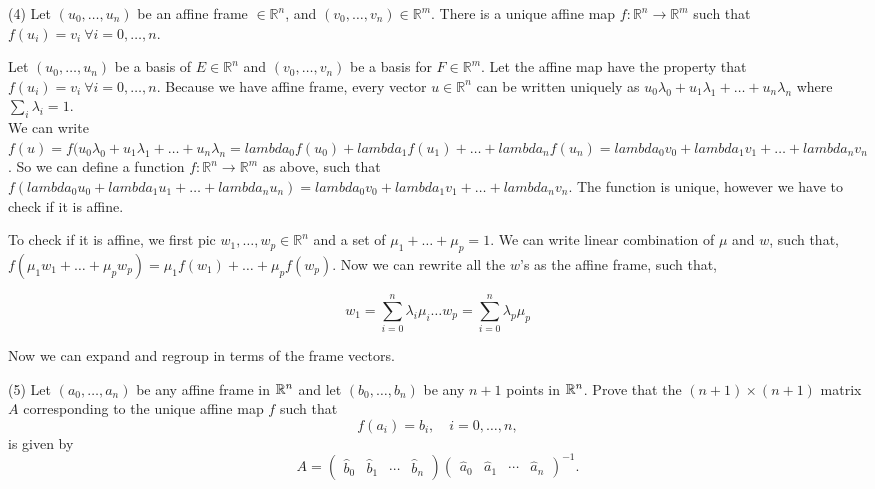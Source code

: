 \documentclass[12pt]{article}
\begin{document}
\medskip
(4) 
Let $(u_0, \ldots, u_n)$ be an affine frame $\in \mathbb{R} ^n$, and $(v_0, \ldots, v_n) \in \mathbb{R}^m$. There is a unique affine map $f: \mathbb{R} ^n \rightarrow \mathbb{R} ^m$ such that $f(u_i) = v_i\ \forall i = 0, \ldots,	n$. 

Let $(u_0, \ldots, u_n)$ be a basis of $E \in \mathbb{R}^n$ and $(v_0, \ldots, v_n)$ be a basis for $F \in \mathbb{R}^m $. Let the affine map have the property that $f(u_i) = v_i\ \forall i = 0, \ldots,	n$. Because we have affine frame, every vector $u \in \mathbb{R}^n$ can be written uniquely as $u_0\lambda_0 + u_1\lambda_1 + \ldots + u_n\lambda_n$ where $\sum_i \lambda_i = 1$. \\

We can write $f(u) = f(u_0\lambda_0 + u_1\lambda_1 + \ldots + u_n\lambda_n = lambda_0f(u_0) + lambda_1f(u_1) + \ldots + lambda_nf(u_n) = lambda_0v_0 + lambda_1v_1 + \ldots + lambda_nv_n$. So we can define a function $f: \mathbb{R} ^n \rightarrow \mathbb{R} ^m$ as above, such that $f(lambda_0u_0 + lambda_1u_1 + \ldots + lambda_nu_n) = lambda_0v_0 + lambda_1v_1 + \ldots + lambda_nv_n$. The function is unique, however we have to check if it is affine. 

To check if it is affine, we first pic $w_1, \ldots, w_p \in \mathbb{R}^n$ and a set of $\mu_1 + \ldots + \mu_p = 1$. We can write linear combination of $\mu$ and $w$, such that, 
$f(\mu_1 w_1 + \ldots + \mu_p w_p) = \mu_1 f(w_1) + \ldots + \mu_p f(w_p)$. Now we can rewrite all the $w$'s as the affine frame, such that, 

$$w_1 = \sum_{i=0}^{n} \lambda_i \mu_i \ldots w_p = \sum_{i=0}^{n} \lambda_p \mu_p$$

Now we can expand and regroup in terms of the frame vectors. 



\medskip
(5)
Let $(a_0, \ldots, a_n)$ be any affine frame in $\mathbb{R}^n$ and
let $(b_0, \ldots, b_n)$ be any $n + 1$ points in $\mathbb{R}^n$. Prove that
the $(n + 1)\times (n + 1)$ matrix $A$ corresponding to
the unique affine map $f$
such that 
\[
f(a_i) = b_i, \quad i = 0, \ldots, n, 
\]
is given by
\[
A = 
\begin{pmatrix}
\widehat{b}_0 & \widehat{b}_1 & \cdots & \widehat{b}_n   
\end{pmatrix}
\begin{pmatrix}
\widehat{a}_0 & \widehat{a}_1 & \cdots & \widehat{a}_n   
\end{pmatrix}^{-1}.
\]
\end{document}
